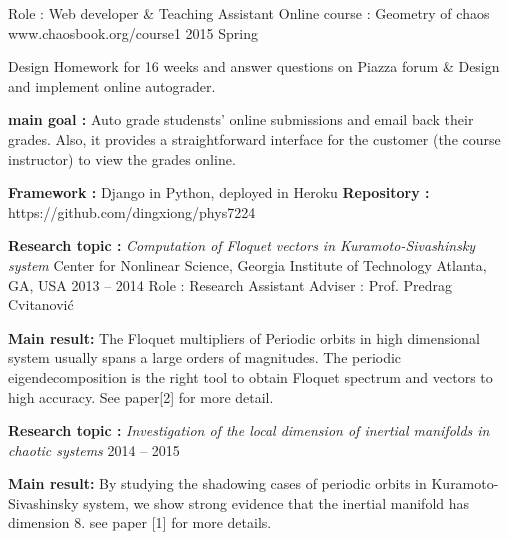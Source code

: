 


\begin{cventries}


\cventry
{Role : Web developer \& Teaching Assistant}
{Online course : Geometry of chaos}
{www.chaosbook.org/course1}
{2015 Spring}
{
  \begin{cvitems}
    \item {Design Homework for 16 weeks and answer questions on
        Piazza forum \& Design and implement online autograder.}
    \item {\textbf{main goal :} Auto grade studensts' online submissions and email back their grades. Also, 
      it provides a straightforward interface for the customer (the course instructor)
      to view the grades online.}
    \item {\textbf{Framework :} Django in Python, deployed in Heroku \quad
      \textbf{Repository :} {\color{red} https://github.com/dingxiong/phys7224} 
    }
  \end{cvitems}
}

\cventrymore
{\textbf{Research topic :} \emph{Computation of Floquet vectors in Kuramoto-Sivashinsky system}}
{Center for Nonlinear Science, Georgia Institute of Technology}
{Atlanta, GA, USA}
{2013 -- 2014}
{Role : Research Assistant \quad Adviser : Prof. Predrag Cvitanovi\'c }
{
  \begin{cvitems}
  \item {\textbf{Main result:} The Floquet multipliers of Periodic orbits in high dimensional system 
      usually spans a large orders of magnitudes. The periodic eigendecomposition is the right tool
      to obtain Floquet spectrum and vectors to high accuracy. See paper[2] for more detail.
    }
  \end{cvitems}
}

\cventry
{\textbf{Research topic :} \emph{Investigation of the local dimension of inertial manifolds in chaotic systems}}
{}{}
{2014 -- 2015}
{
  \begin{cvitems}
    \item {\textbf{Main result:} By studying the shadowing cases of periodic orbits in
        Kuramoto-Sivashinsky system, we show strong evidence that the inertial manifold has
        dimension 8. see paper [1] for more details.}
  \end{cvitems}
}


\end{cventries}
